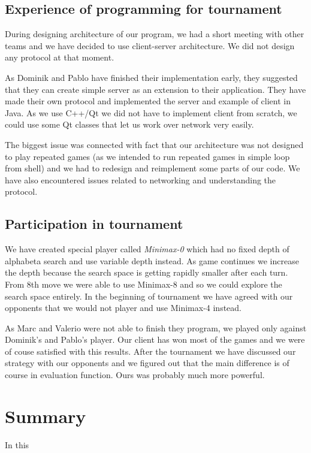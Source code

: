\documentclass[paper=a4, fontsize=11pt]{article} %
\begin{document}
\subsection{Experience of programming for tournament}
During designing architecture of our program, we had a short  meeting with other teams and we have decided to use client-server architecture. 
We did not design any protocol at that moment.

As Dominik and Pablo have finished their implementation early, they suggested that they can create simple server as an extension to their application. 
They have made their own protocol and implemented the server and example of client in Java. 
As we use C++/Qt we did not have to implement client from scratch, we could use some Qt classes that let us work over network very easily. 

The biggest issue was connected with fact that our architecture was not designed to play repeated games (as we intended to run repeated games in simple loop from shell) and we had to redesign and reimplement some parts of our code. We have also encountered issues related to networking and understanding the protocol.

\subsection{Participation in tournament}
We have created special player called \emph{Minimax-0} which had no fixed depth of alphabeta search and use variable depth instead. As game continues we increase the depth because the search space is getting rapidly smaller after each turn. From 8th move we were able to use Minimax-8 and so we could explore the search space entirely. In the beginning of tournament we have agreed with our opponents that we would not player and use Minimax-4 instead.

As Marc and Valerio were not able to finish they program, we played only against Dominik's and Pablo's player. Our client has won most of the games and we were of couse satisfied with this results. After the tournament we have discussed our strategy with our opponents and we figured out that the main difference is of course in evaluation function. Ours was probably much more powerful.

\section{Summary}
In this 

\begin{flushleft}
%
\end{flushleft}
\end{document}

